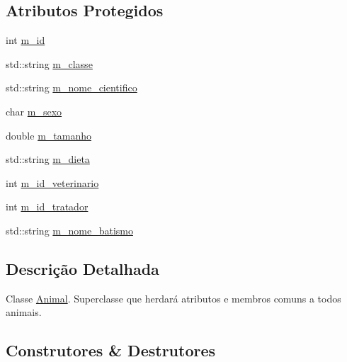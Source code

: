 \subsection*{Atributos Protegidos}
\begin{DoxyCompactItemize}
\item 
int \hyperlink{classAnimal_a1a39448480e098fc74b5b67c4921a5ec}{m\+\_\+id}
\item 
std\+::string \hyperlink{classAnimal_a8a4d049b481ab0fe88015cde7557d281}{m\+\_\+classe}
\item 
std\+::string \hyperlink{classAnimal_af90a04b32166b6815617cfd4033da1e4}{m\+\_\+nome\+\_\+cientifico}
\item 
char \hyperlink{classAnimal_aaa6d77e661ed0fa9a33500588c8acfef}{m\+\_\+sexo}
\item 
double \hyperlink{classAnimal_afe83ba40e79b42d06b0c95f61aaa0218}{m\+\_\+tamanho}
\item 
std\+::string \hyperlink{classAnimal_af7ea074464d9a468f7412a2165afd553}{m\+\_\+dieta}
\item 
int \hyperlink{classAnimal_aede0aba11b84579298edaa39d3cf0825}{m\+\_\+id\+\_\+veterinario}
\item 
int \hyperlink{classAnimal_a9a02c10e96d8139fefb4c6c21a30f658}{m\+\_\+id\+\_\+tratador}
\item 
std\+::string \hyperlink{classAnimal_aa9717b7e2de07af7118050ca1c10d0b5}{m\+\_\+nome\+\_\+batismo}
\end{DoxyCompactItemize}


\subsection{Descrição Detalhada}
Classe \hyperlink{classAnimal}{Animal}. Superclasse que herdará atributos e membros comuns a todos animais. 

\subsection{Construtores \& Destrutores}
\mbox{\label{classAnimal_a4ce85e4ceabe2a6342a3dcbbd18f5bc1}} 
